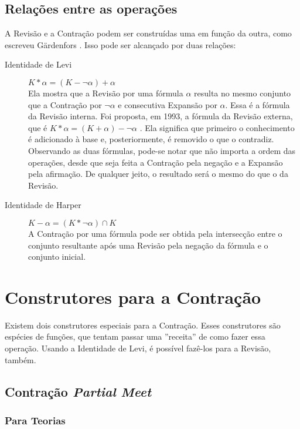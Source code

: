 \subsection{Relações entre as operações}

A Revisão e a Contração podem ser construídas uma em função da outra, como escreveu Gärdenfors \citep{revisaoGardenfors}. Isso pode ser alcançado por duas relações:

\begin{description}
	\item[Identidade de Levi] $ K \ast \alpha = (K - \lnot \alpha) + \alpha $ \\ Ela mostra que a Revisão por uma fórmula $ \alpha $ resulta no mesmo conjunto que a Con\-tra\-ção por $ \lnot \alpha $ e consecutiva Expansão por $ \alpha $. Essa é a fórmula da Revisão interna. Foi proposta, em 1993, a fórmula da Revisão externa, que é $ K \ast \alpha = (K + \alpha) - \lnot \alpha $ \citep{revisaoHansson2}. Ela significa que primeiro o conhecimento é adicionado à base e, posteriormente, é removido o que o contradiz. Observando as duas fórmulas, pode-se notar que não importa a ordem das operações, desde que seja feita a Contração pela negação e a Expansão pela afirmação. De qualquer jeito, o resultado será o mesmo do que o da Revisão.
	\item[Identidade de Harper] $ K - \alpha = (K \ast \lnot \alpha) \cap K $ \\ A Contração por uma fórmula pode ser obtida pela intersecção entre o conjunto resultante após uma Revisão pela negação da fórmula e o conjunto inicial.
\end{description}

\section{Construtores para a Contração}

Existem dois construtores especiais para a Contração. Esses construtores são espécies de funções, que tentam passar uma ''receita'' de como fazer essa operação. Usando a Identidade de Levi, é possível fazê-los para a Revisão, também.

\subsection{Contração \textit{Partial Meet}}

\subsubsection{Para Teorias}

